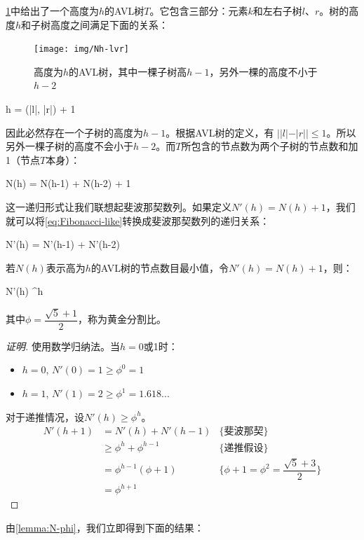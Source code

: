 \documentclass[b5paper]{ctexart}
\begin{document}
\cref{fig:N-h-relation}中给出了一个高度为$h$的AVL树$T$。它包含三部分：元素$k$和左右子树$l$、$r$。树的高度$h$和子树高度之间满足下面的关系：

\begin{figure}[htbp]
   \centering
   \texttt{[image: img/Nh-lvr]}
   \caption{高度为$h$的AVL树，其中一棵子树高$h - 1$，另外一棵的高度不小于$h - 2$}
   \label{fig:N-h-relation}
\end{figure}

\be
  h = \max(|l|, |r|) + 1
\ee

因此必然存在一个子树的高度为$h - 1$。根据AVL树的定义，有 $||l| -|r|| \leq 1$。所以另外一棵子树的高度不会小于$h - 2$。而$T$所包含的节点数为两个子树的节点数和加1（节点$T$本身）：

\be
  N(h) = N(h-1) + N(h-2) + 1
  \label{eq:Fibonacci-like}
\ee

这一递归形式让我们联想起斐波那契数列。如果定义$N'(h) = N(h) + 1$，我们就可以将\cref{eq:Fibonacci-like}转换成斐波那契数列的递归关系：

\be
  N'(h) = N'(h-1) + N'(h-2)
\ee

\begin{lemma}
\label{lemma:N-phi}
若$N(h)$表示高为$h$的AVL树的节点数目最小值，令$N'(h) = N(h) + 1$，则：

\be
  N'(h) \geq \phi^h
\ee

其中$\phi = \dfrac{\sqrt{5}+1}{2}$，称为黄金分割比。
\end{lemma}

\begin{proof}[证明]
使用数学归纳法。当$h = 0$或1时：
\begin{itemize}
\item $h = 0$, $N'(0) = 1 \geq \phi^0 = 1$
\item $h = 1$, $N'(1) = 2 \geq \phi^1 = 1.618...$
\end{itemize}

对于递推情况，设$N'(h) \geq \phi^h$。
\[
  \begin{array}{lll}
  N'(h+1) & = N'(h) + N'(h-1) & \{\text{斐波那契}\} \\
          & \geq \phi^h + \phi^{h-1} & \{\text{递推假设}\}\\
          & = \phi^{h-1}(\phi + 1) & \{\phi + 1 = \phi^2 = \dfrac{\sqrt{5}+3}{2}\} \\
          & = \phi^{h+1}
 \end{array}
\]
\end{proof}

由\cref{lemma:N-phi}，我们立即得到下面的结果：
\end{document}

